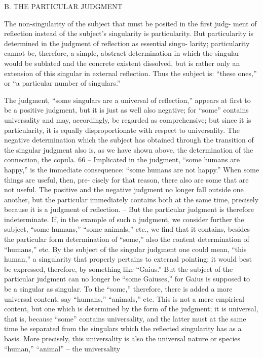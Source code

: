 B. THE PARTICULAR JUDGMENT

The non-singularity of the subject that must be posited in the first judg-
ment of reflection instead of the subject's singularity is particularity. But
particularity is determined in the judgment of reflection as essential singu-
larity; particularity cannot be, therefore, a simple, abstract determination in
which the singular would be sublated and the concrete existent dissolved,
but is rather only an extension of this singular in external reflection. Thus
the subject is: “these ones,” or “a particular number of singulars.”

The judgment, “some singulars are a universal of reflection,” appears at
first to be a positive judgment, but it is just as well also negative; for “some”
contains universality and may, accordingly, be regarded as comprehensive;
but since it is particularity, it is equally disproportionate with respect to
universality. The negative determination which the subject has obtained
through the transition of the singular judgment also is, as we have shown
above, the determination of the connection, the copula. 66 – Implicated
in the judgment, “some humans are happy,” is the immediate consequence:
“some humans are not happy.” When some things are useful, then, pre-
cisely for that reason, there also are some that are not useful. The positive
and the negative judgment no longer fall outside one another, but the
particular immediately contains both at the same time, precisely because
it is a judgment of reflection. – But the particular judgment is therefore
indeterminate.
If, in the example of such a judgment, we consider further the subject,
“some humans,” “some animals,” etc., we find that it contains, besides the
particular form determination of “some,” also the content determination
of “humans,” etc. By the subject of the singular judgment one could mean,
“this human,” a singularity that properly pertains to external pointing; it
would best be expressed, therefore, by something like “Gaius.” But the
subject of the particular judgment can no longer be “some Gaiuses,” for
Gaius is supposed to be a singular as singular. To the “some,” therefore,
there is added a more universal content, say “humans,” “animals,” etc. This
is not a mere empirical content, but one which is determined by the form of
the judgment; it is universal, that is, because “some” contains universality,
and the latter must at the same time be separated from the singulars which
the reflected singularity has as a basis. More precisely, this universality is
also the universal nature or species “human,” “animal” – the universality
